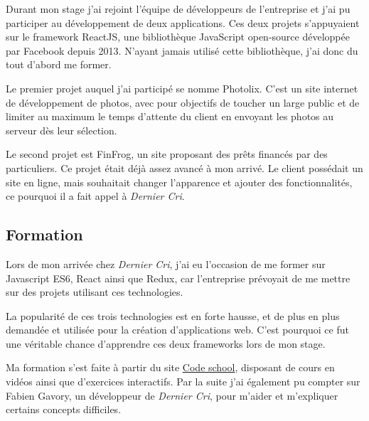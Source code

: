 \documentclass[12pt,a4paper]{article}
\begin{document}
  \bigskip

  Durant mon stage j'ai rejoint l'équipe de développeurs de l'entreprise
  et j'ai pu participer au développement de deux applications. Ces deux
  projets s'appuyaient sur le framework ReactJS, une bibliothèque
  JavaScript open-source développée par Facebook depuis 2013. N'ayant
  jamais utilisé cette bibliothèque, j'ai donc du tout d'abord me former.

  \bigskip

  Le premier projet auquel j'ai participé se nomme Photolix. C'est un site
  internet de développement de photos, avec pour objectifs de toucher un
  large public et de limiter au maximum le temps d'attente du client en
  envoyant les photos au serveur dès leur sélection.

  \bigskip

  Le second projet est FinFrog, un site proposant des prêts financés par
  des particuliers. Ce projet était déjà assez avancé à mon arrivé. Le
  client possédait un site en ligne, mais souhaitait changer l'apparence
  et ajouter des fonctionnalités, ce pourquoi il a fait appel à
  \emph{Dernier Cri}.

  \bigskip

  \subsection{Formation}\label{formation}

  \bigskip

  Lors de mon arrivée chez \emph{Dernier Cri}, j'ai eu l'occasion de me
  former sur Javascript ES6, React ainsi que Redux, car l'entreprise
  prévoyait de me mettre sur des projets utilisant ces technologies.

  \bigskip

  La popularité de ces trois technologies est en forte hausse, et de plus
  en plus demandée et utilisée pour la création d'applications web. C'est
  pourquoi ce fut une véritable chance d'apprendre ces deux frameworks
  lors de mon stage.

  \bigskip

  Ma formation s'est faite à partir du site
  \href{https://www.codeschool.com/}{Code school}, disposant de cours en
  vidéos ainsi que d'exercices interactifs. Par la suite j'ai également pu
  compter sur Fabien Gavory, un développeur de \emph{Dernier Cri}, pour
  m'aider et m'expliquer certains concepts difficiles.

  \bigskip
\end{document}
